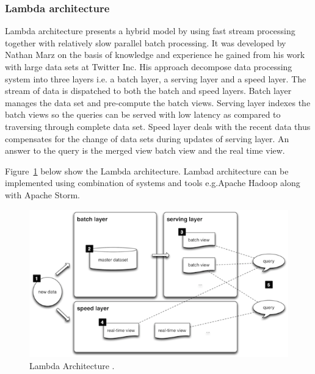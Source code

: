 \subsubsection{ Lambda architecture}
Lambda architecture presents a hybrid model by using fast stream processing together with relatively slow parallel batch processing.  It was developed by Nathan Marz on the basis of knowledge and experience he gained from his work with large data sets at Twitter Inc.   His approach decompose data processing system into three layers i.e. a batch layer, a serving layer and a speed layer. The stream of data is dispatched to both the batch and speed layers. Batch layer manages the data set and pre-compute the batch views. Serving layer indexes the batch views so the queries can be served with low latency as compared to traversing through complete data set. Speed layer deals with the recent data thus compensates for the change of data sets during updates of serving layer. An answer to the query is the merged view batch view and the real time view.\cite{marz2013big}\cite{lambdaarch} 

Figure~\ref{fig:lambda} below show the Lambda architecture. Lambad architecture can be implemented using combination of systems and tools e.g.Apache Hadoop along with Apache Storm.
\begin{figure}[ht]
  \begin{center}
    \includegraphics[width=\textwidth]{images/lambda.png}
    \caption{Lambda Architecture \cite{lambdaarch}.}
    \label{fig:lambda}
  \end{center}
\end{figure}

